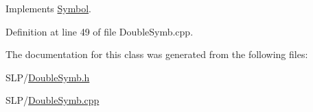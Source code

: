 Implements \hyperlink{class_symbol_a53b98ce639c66d1b2e73992f20f56c54}{Symbol}.



Definition at line 49 of file Double\+Symb.\+cpp.



The documentation for this class was generated from the following files\+:\begin{DoxyCompactItemize}
\item 
S\+L\+P/\hyperlink{_double_symb_8h}{Double\+Symb.\+h}\item 
S\+L\+P/\hyperlink{_double_symb_8cpp}{Double\+Symb.\+cpp}\end{DoxyCompactItemize}
